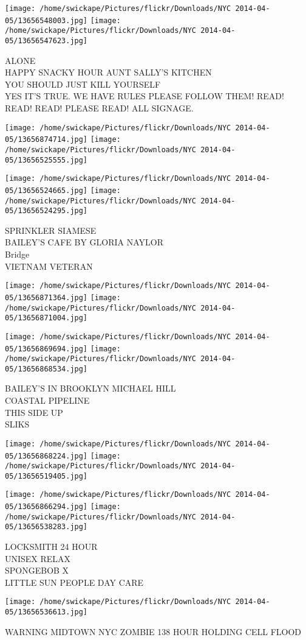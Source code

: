 \documentclass[10pt,letterpaper]{article}
\begin{document}
\texttt{[image: /home/swickape/Pictures/flickr/Downloads/NYC 2014-04-05/13656548003.jpg]}
\texttt{[image: /home/swickape/Pictures/flickr/Downloads/NYC 2014-04-05/13656547623.jpg]}

ALONE\\
HAPPY SNACKY HOUR AUNT SALLY'S KITCHEN\\
YOU SHOULD JUST KILL YOURSELF\\
YES IT'S TRUE.  WE HAVE RULES PLEASE FOLLOW THEM!  READ! READ! READ! PLEASE READ! ALL SIGNAGE.\\
\pagebreak

\texttt{[image: /home/swickape/Pictures/flickr/Downloads/NYC 2014-04-05/13656874714.jpg]}
\texttt{[image: /home/swickape/Pictures/flickr/Downloads/NYC 2014-04-05/13656525555.jpg]}

\texttt{[image: /home/swickape/Pictures/flickr/Downloads/NYC 2014-04-05/13656524665.jpg]}
\texttt{[image: /home/swickape/Pictures/flickr/Downloads/NYC 2014-04-05/13656524295.jpg]}

SPRINKLER SIAMESE\\
BAILEY'S CAFE BY GLORIA NAYLOR\\
Bridge\\
VIETNAM VETERAN\\
\pagebreak

\texttt{[image: /home/swickape/Pictures/flickr/Downloads/NYC 2014-04-05/13656871364.jpg]}
\texttt{[image: /home/swickape/Pictures/flickr/Downloads/NYC 2014-04-05/13656871004.jpg]}

\texttt{[image: /home/swickape/Pictures/flickr/Downloads/NYC 2014-04-05/13656869694.jpg]}
\texttt{[image: /home/swickape/Pictures/flickr/Downloads/NYC 2014-04-05/13656868534.jpg]}

BAILEY'S IN BROOKLYN MICHAEL HILL\\
COASTAL PIPELINE\\
THIS SIDE UP\\
SLIKS\\
\pagebreak

\texttt{[image: /home/swickape/Pictures/flickr/Downloads/NYC 2014-04-05/13656868224.jpg]}
\texttt{[image: /home/swickape/Pictures/flickr/Downloads/NYC 2014-04-05/13656519405.jpg]}

\texttt{[image: /home/swickape/Pictures/flickr/Downloads/NYC 2014-04-05/13656866294.jpg]}
\texttt{[image: /home/swickape/Pictures/flickr/Downloads/NYC 2014-04-05/13656538283.jpg]}

LOCKSMITH 24 HOUR\\
UNISEX RELAX\\
SPONGEBOB X\\
LITTLE SUN PEOPLE DAY CARE\\
\pagebreak

\texttt{[image: /home/swickape/Pictures/flickr/Downloads/NYC 2014-04-05/13656536613.jpg]}

WARNING MIDTOWN NYC ZOMBIE 138 HOUR HOLDING CELL FLOOD\\
\pagebreak
\end{document}
